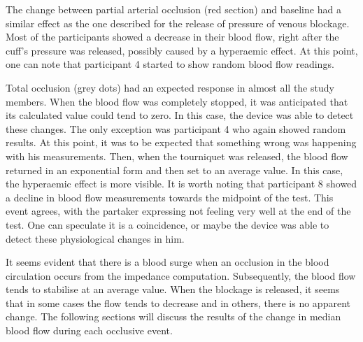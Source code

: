 The change between partial arterial occlusion (red section) and baseline had a similar effect as the one described for the release of pressure of venous blockage. Most of the participants showed a decrease in their blood flow, right after the cuff's pressure was released, possibly caused by a hyperaemic effect. At this point, one can note that participant 4 started to show random blood flow readings.

Total occlusion (grey dots) had an expected response in almost all the study members. When the blood flow was completely stopped, it was anticipated that its calculated value could tend to zero. In this case, the device was able to detect these changes. The only exception was participant 4 who again showed random results. At this point, it was to be expected that something wrong was happening with his measurements. Then, when the tourniquet was released, the blood flow returned in an exponential form and then set to an average value. In this case, the hyperaemic effect is more visible. It is worth noting that participant 8 showed a decline in blood flow measurements towards the midpoint of the test. This event agrees, with the partaker expressing not feeling very well at the end of the test. One can speculate it is a coincidence, or maybe the device was able to detect these physiological changes in him.

It seems evident that there is a blood surge when an occlusion in the blood circulation occurs from the impedance computation. Subsequently, the blood flow tends to stabilise at an average value. When the blockage is released, it seems that in some cases the flow tends to decrease and in others, there is no apparent change. The following sections will discuss the results of the change in median blood flow during each occlusive event.


